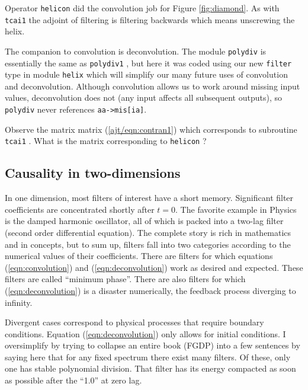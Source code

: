 \par
Operator {\tt helicon} did the convolution job for Figure \ref{fig:diamond}.
As with
\texttt{tcai1} 
the adjoint of filtering is filtering backwards
which means unscrewing the helix.

\par
The companion to convolution is deconvolution.
The module \texttt{polydiv} 
is essentially the same as
\texttt{polydiv1} ,
but here it was coded using
our new \texttt{filter} type in
module \texttt{helix} 
which will simplify our many future uses of
convolution and deconvolution.
Although convolution allows us to work around missing input values,
deconvolution does not
(any input affects all subsequent outputs),
so \texttt{polydiv} never references \verb#aa->mis[ia]#.

\begin{exer}
\item
Observe the matrix matrix (\ref{ajt/eqn:contran1})
which corresponds to
subroutine
\texttt{tcai1} .
What is the matrix corresponding to
\texttt{helicon} ?
\end{exer}

\subsection{Causality in two-dimensions}
In one dimension, most filters of interest have a short memory.
Significant filter coefficients are concentrated shortly after $t=0$.
The favorite example in Physics is the
damped harmonic oscillator,
all of which is packed into a two-lag filter
(second order differential equation).
The complete story is rich in mathematics and in concepts,
but to sum up, filters fall into two categories according to the
numerical values of their coefficients.
There are filters for which equations
(\ref{eqn:convolution}) and
(\ref{eqn:deconvolution})
work as desired and expected.
These filters are called ``minimum phase''.
There are also filters for which
(\ref{eqn:deconvolution}) is a disaster numerically,
the feedback process diverging to infinity.

\par
Divergent cases correspond to physical processes
that require boundary conditions.
Equation (\ref{eqn:deconvolution})
only allows for initial conditions.
I oversimplify by trying to collapse an entire book (FGDP)
into a few sentences by saying here that
for any fixed spectrum
there exist many filters.
Of these, only one has
stable polynomial division.
That filter has its energy compacted
as soon as possible after the ``1.0'' at zero lag.

